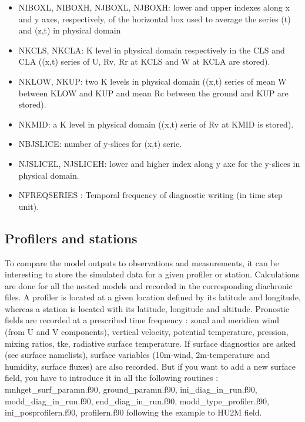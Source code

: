 \begin{itemize}
\item
NIBOXL, NIBOXH, NJBOXL, NJBOXH: lower and upper indexes along x and y axes, respectively, 
 of the horizontal box used to average the series (t) and (z,t) in physical domain
\item
NKCLS, NKCLA: K level in physical domain respectively in the CLS and CLA ((x,t) series of
 U, Rv, Rr at KCLS and W at KCLA are stored).
\item NKLOW, NKUP: two K levels in physical domain ((x,t) series of mean W between KLOW and KUP
 and mean Rc between the ground and KUP are stored).
\item NKMID: a K level in physical domain ((x,t) serie of Rv at KMID is stored).
\item NBJSLICE: number of y-slices for (x,t) serie.
\item NJSLICEL, NJSLICEH: lower and higher index along y axe for the y-slices in physical domain.
\item NFREQSERIES : Temporal frequency of diagnostic writing (in time step unit).                    
\end{itemize}

\subsection{Profilers and stations} 
\label{ss:station}
To compare the model outputs to observations
and measurements, it can be interesting to store the simulated data for a given
profiler or station. Calculations are done for all the nested models and recorded in the corresponding diachronic files.
 A profiler is located at a given location defined by its
latitude and longitude, whereas a station is located with its latitude, 
longitude and altitude.
Pronostic fields are recorded at a prescribed time frequency : 
zonal and meridien wind
(from U and V components), vertical velocity, potential temperature, pression,
mixing ratios, tke, radiative surface temperature.
If surface diagnostics are asked (see surface namelists), surface variables
(10m-wind, 2m-temperature and humidity, surface fluxes) are also recorded. But if you want to add a new surface field, you have to introduce it in all the following routines : mnhget\_surf\_paramn.f90, ground\_paramn.f90, ini\_diag\_in\_run.f90, modd\_diag\_in\_run.f90, end\_diag\_in\_run.f90, modd\_type\_profiler.f90, ini\_posprofilern.f90, profilern.f90  following the example to HU2M field. 


